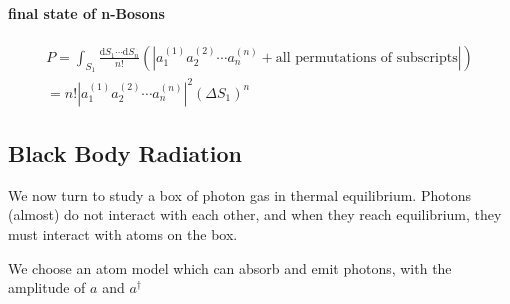 \paragraph{final state of n-Bosons}
\begin{gather}
  P = \int_{S_1} \frac{\mathrm{d} S_1 \cdots \mathrm{d} S_n}{n!} \left( \left| a_{1}^{(1)} a_2^{(2)} \cdots a_n^{(n)} + \text{all permutations of subscripts}  \right|  \right) 
  \\
  = n! \left| a_1^{(1)} a_2^{(2)} \cdots a_n^{(n)} \right| ^{2} \left( \Delta S_1 \right) ^{n}
\end{gather}

\subsection[黑体辐射]{Black Body Radiation}
We now turn to study a box of photon gas in thermal equilibrium. 
Photons (almost) do not interact with each other, and when they reach equilibrium, they must interact with atoms on the box.

We choose an atom model which can absorb and emit photons, with the amplitude of $a$ and $a^{\dagger}$